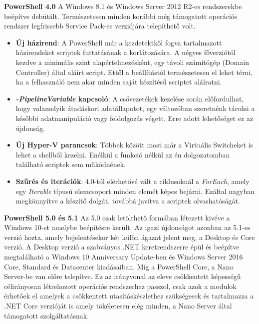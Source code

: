 \documentclass[12pt,oneside,justify,table]{book}
\begin{document}
\noindent\textbf{PowerShell 4.0}
\newline A Windows 8.1 és Windows Server 2012 R2-es rendszerekbe beépítve debütált. Természetesen minden korábbi még támogatott operációs rendszer legfrissebb Service Pack-es verziójára telepíthető volt.

\begin{itemize}
	\item \textbf{Új házirend}: A PowerShell már a kezdetektkől fogva tartalmazott házirendeket scriptek futtatásának a korlátozására. A négyes főverziótól kezdve a minimális szint alapértelmezésként, egy távoli számítógép (Domain Controller) által aláírt script. Ettől a beállítástól természetesen el lehet térni, ha a felhasználó nem akar minden saját készítésű scriptet aláíratni.
	\item \textbf{\textit{-PipelineVariable} kapcsoló}: A csővezetékek kezelése során előfordulhat, hogy valamelyik átadáskori adatállapotot, egy változóban szeretnénk tárolni a későbbi adatmanipuláció vagy feldolgozás végett. Erre adott lehetőséget ez az újdonság.
	\item \textbf{Új Hyper-V parancsok}: Többek között most már a Virtuális Switcheket is lehet a shellből kezelni. Enélkül a funkció nélkül az én dolgozatomban található scriptek sem működnének.
	\item \textbf{Szűrés és iterációk}: 4.0-tól elérhetővé vált a ciklusoknál a \textit{ForEach}, amely egy \textit{Iterable} típusú elemcsoport minden elemét képes bejárni. Ezáltal nagyban megkönnyítve a készítő dolgát, továbbá javítva a scriptek olvashatóságát.
\end{itemize}

\noindent\textbf{PowerShell 5.0 és 5.1}
\newline Az 5.0 csak letölthető formában létezett kivéve a Windows 10-et amelybe beépítésre került. Az igazi újdonságot azonban az 5.1-es verzió hozta, amely bejelentésekor két külön ágazat jelent meg, a Desktop és Core verzió. A Desktop verzió a szabványos .NET keretrendszerre épül és beépítve megtalálható a Windows 10 Anniversary Update-ben és Windows Server 2016 Core, Standard és Datacenter kiadásaiban. Míg a PowerShell Core, a Nano Server-be van előre telepítve. Ez az irányvonal az eleve csökkentett képességű célirányosan létrehozott operációs rendszerhez passzol, csak azok a modulok érhetőek el amelyek a csökkentett utasításkészlethez szükségesek és tartalmazza a .NET Core verzióját is amely tökéletesen elég minden, a Nano Server által támogatott szolgáltatásnak.\\
\end{document}
